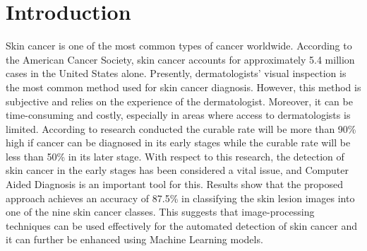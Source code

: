 \documentclass{article}
\begin{document}
\section{Introduction}
Skin cancer is one of the most common types of cancer worldwide. According to the American Cancer Society, skin cancer accounts for approximately 5.4 million cases in the United States alone. Presently, dermatologists' visual inspection is the most common method used for skin cancer diagnosis. However, this method is subjective and relies on the experience of the dermatologist. Moreover, it can be time-consuming and costly, especially in areas where access to dermatologists is limited. According to research conducted the curable rate will be more than 90\% high if cancer can be diagnosed in its early stages while the curable rate will be less than 50\% in its later stage. With respect to this research, the detection of skin cancer in the early stages has been considered a vital issue, and Computer Aided Diagnosis is an important tool for this. Results show that the proposed approach achieves an accuracy of 87.5\% in classifying the skin lesion images into one of the nine skin cancer classes. This suggests that image-processing techniques can be used effectively for the automated detection of skin cancer and it can further be enhanced using Machine Learning models.
\end{document}
